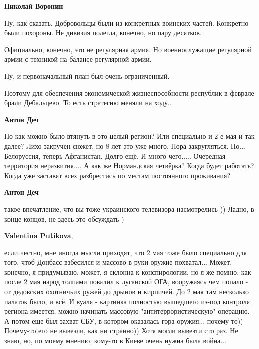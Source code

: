 \begin{itemize}
\begin{itemize}
\textbf{Николай Воронин} 

Ну, как сказать. Добровольцы были из конкретных воинских частей. Конкретно были
похороны. Не дивизия полегла, конечно, но пару десятков.

Официально, конечно, это не регулярная армия. Но военнослужащие регулярной
армии с техникой на балансе регулярной армии.

Ну, и первоначальный план был очень ограниченный.

Поэтому для обеспечения экономической жизнеспособности республик в феврале
брали Дебальцево. То есть стратегию меняли на ходу..

 
\textbf{Антон Деч} 

Но как можно было втянуть в это целый регион? Или специально и 2-е мая и так
далее? Лихо закручен сюжет, но 8 лет-это уже много. Пора закругляться.
Но... Белоруссия, теперь Афганистан. Долго ещё. И много чего..... Очередная
территория неразвития.... А как же Нормандская четвёрка? Когда будет работать?
Когда уже заставят всех разбрестись по местам постоянного проживания?


 
\textbf{Антон Деч} 

такое впечатление, что вы тоже украинского телевизора насмотрелись )) Ладно, в
конце концов, не здесь это обсуждать )

 
\textbf{Valentina Putikova}, 

если честно, мне иногда мысли приходят, что 2 мая тоже было специально для
того, чтоб Донбасс взбесился и массово в руки оружие похватал... Может,
конечно, я придумываю, может, я склонна к конспирологии, но я же помню. как
после 2 мая народ толпами повалил к луганской ОГА, вооружаясь чем попало - от
дедовских охотничьих ружей до дрынов и кирпичей. До 2 мая там несколько палаток
было, и всё. И вуаля - картинка полностью вышедшего из-под контроля региона
имеется, можно начинать массовую "антитеррористическую" операцию. А потом еще
был захват СБУ, в котором оказалась гора оружия... почему-то)) Почему-то его не
вывезли, как ни странно)) Хотя могли вывезти сто раз. Не знаю, но, по моему
мнению, кому-то в Киеве очень нужна была война...


\end{itemize}
\end{itemize}
